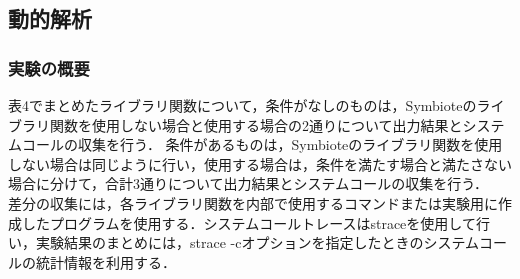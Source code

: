 \documentclass[submit,techreq,noauthor]{eco}	%
\begin{document}
\subsection{動的解析}
\subsubsection{実験の概要}
表4でまとめたライブラリ関数について，条件がなしのものは，Symbioteのライブラリ関数を使用しない場合と使用する場合の2通りについて出力結果とシステムコールの収集を行う．
条件があるものは，Symbioteのライブラリ関数を使用しない場合は同じように行い，使用する場合は，条件を満たす場合と満たさない場合に分けて，合計3通りについて出力結果とシステムコールの収集を行う．\\
\indent
差分の収集には，各ライブラリ関数を内部で使用するコマンドまたは実験用に作成したプログラムを使用する．システムコールトレースはstraceを使用して行い，実験結果のまとめには，strace -cオプションを指定したときのシステムコールの統計情報を利用する．\\
\end{document}
